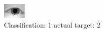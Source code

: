\begin{figure}[h!]
\begin{center}
\includegraphics[width=0.60\columnwidth]{figures/ID1027_class_1_target_2.png}
\end{center}
\caption{ Classification: 1 actual target: 2}
\label{fig:ID1027_class_1_target_2}
\end{figure}
